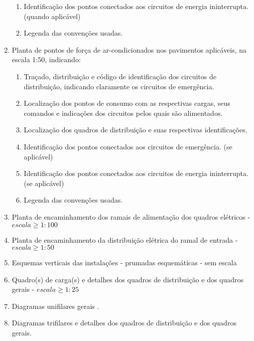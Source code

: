 \begin{enumerate}
\begin{enumerate}
			\item Identificação dos pontos conectados aos circuitos de energia ininterrupta. (quando aplicável)
			
			\item Legenda das convenções usadas.
		\end{enumerate}


		\item Planta de pontos de força de ar-condicionados nos pavimentos aplicáveis, na escala 1:50, indicando:
		\begin{enumerate}
			\item Traçado, distribuição e código de identificação dos circuitos de distribuição, indicando claramente os circuitos de emergência.
			
			\item Localização dos pontos de consumo com as respectivas cargas, seus comandos e indicações dos circuitos pelos quais são alimentados.
			
			\item Localização dos quadros de distribuição e suas respectivas identificações.
			
			\item Identificação dos pontos conectados aos circuitos de emergência. (se aplicável)
			
			\item Identificação dos pontos conectados aos circuitos de energia ininterrupta. (se aplicável)
			
			\item Legenda das convenções usadas.
		\end{enumerate}

		\item Planta de encaminhamento dos ramais de alimentação dos quadros elétricos - $escala \geq 1:100$

		\item Planta de encaminhamento da distribuição elétrica do ramal de entrada - $escala \geq 1:50$
		
		\item Esquemas verticais das instalações - prumadas esquemáticas - sem escala

		\item Quadro(s) de carga(s) e detalhes dos quadros de distribuição e dos quadros gerais - $escala \geq 1:25$

		\item Diagramas unifilares gerais .
		
		\item Diagramas trifilares e detalhes dos quadros de distribuição e dos quadros gerais.


\end{enumerate}
